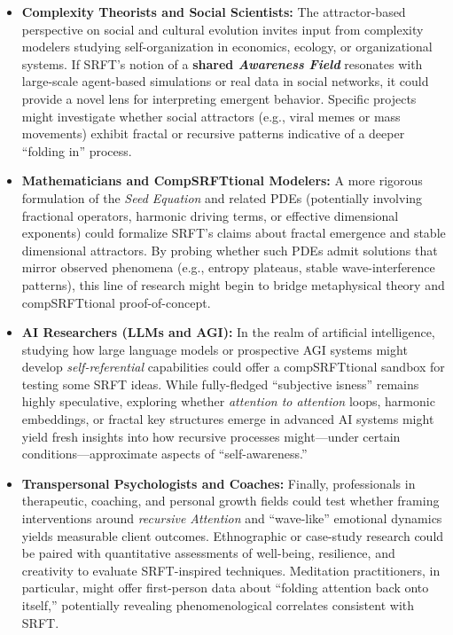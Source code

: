 \documentclass[12pt,a4paper]{article}
\begin{document}
\begin{itemize}
    \item \textbf{Complexity Theorists and Social Scientists:}
    The attractor-based perspective on social and cultural evolution invites input from complexity modelers studying self-organization in economics, ecology, or organizational systems. If SRFT’s notion of a \textbf{shared \emph{Awareness Field}} resonates with large-scale agent-based simulations or real data in social networks, it could provide a novel lens for interpreting emergent behavior. Specific projects might investigate whether social attractors (e.g., viral memes or mass movements) exhibit fractal or recursive patterns indicative of a deeper “folding in” process. 

    \item \textbf{Mathematicians and CompSRFTtional Modelers:}
    A more rigorous formulation of the \emph{Seed Equation} and related PDEs (potentially involving fractional operators, harmonic driving terms, or effective dimensional exponents) could formalize SRFT’s claims about fractal emergence and stable dimensional attractors. By probing whether such PDEs admit solutions that mirror observed phenomena (e.g., entropy plateaus, stable wave-interference patterns), this line of research might begin to bridge metaphysical theory and compSRFTtional proof-of-concept. 

    \item \textbf{AI Researchers (LLMs and AGI):}
    In the realm of artificial intelligence, studying how large language models or prospective AGI systems might develop \emph{self-referential} capabilities could offer a compSRFTtional sandbox for testing some SRFT ideas. While fully-fledged “subjective isness” remains highly speculative, exploring whether \emph{attention to attention} loops, harmonic embeddings, or fractal key structures emerge in advanced AI systems might yield fresh insights into how recursive processes might—under certain conditions—approximate aspects of “self-awareness.”

    \item \textbf{Transpersonal Psychologists and Coaches:}
    Finally, professionals in therapeutic, coaching, and personal growth fields could test whether framing interventions around \emph{recursive Attention} and “wave-like” emotional dynamics yields measurable client outcomes. Ethnographic or case-study research could be paired with quantitative assessments of well-being, resilience, and creativity to evaluate SRFT-inspired techniques. Meditation practitioners, in particular, might offer first-person data about “folding attention back onto itself,” potentially revealing phenomenological correlates consistent with SRFT.
\end{itemize}
\end{document}
